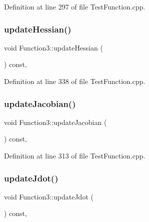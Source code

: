 Definition at line 297 of file Test\+Function.\+cpp.

\hypertarget{classFunction3_a9255f1b3b5e85def42c228a6dec43317}{}\label{classFunction3_a9255f1b3b5e85def42c228a6dec43317} 
\subsubsection{\texorpdfstring{update\+Hessian()}{updateHessian()}}
{\footnotesize\ttfamily void Function3\+::update\+Hessian (\begin{DoxyParamCaption}{ }\end{DoxyParamCaption}) const\hspace{0.3cm}{\ttfamily [inline]}, {\ttfamily [protected]}}



Definition at line 338 of file Test\+Function.\+cpp.

\hypertarget{classFunction3_a6e94cc5951344e5a44f830d7040100b1}{}\label{classFunction3_a6e94cc5951344e5a44f830d7040100b1} 
\subsubsection{\texorpdfstring{update\+Jacobian()}{updateJacobian()}}
{\footnotesize\ttfamily void Function3\+::update\+Jacobian (\begin{DoxyParamCaption}{ }\end{DoxyParamCaption}) const\hspace{0.3cm}{\ttfamily [inline]}, {\ttfamily [protected]}}



Definition at line 313 of file Test\+Function.\+cpp.

\hypertarget{classFunction3_a416607e3c9ac711bf693b1dbf57e7b8b}{}\label{classFunction3_a416607e3c9ac711bf693b1dbf57e7b8b} 
\subsubsection{\texorpdfstring{update\+Jdot()}{updateJdot()}}
{\footnotesize\ttfamily void Function3\+::update\+Jdot (\begin{DoxyParamCaption}{ }\end{DoxyParamCaption}) const\hspace{0.3cm}{\ttfamily [inline]}, {\ttfamily [protected]}}



